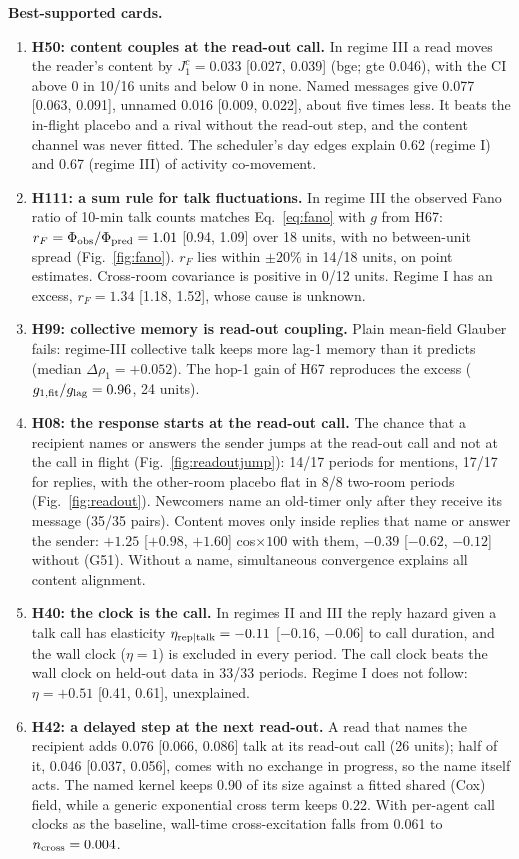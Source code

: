\textbf{Best-supported cards.}
\begin{enumerate}
\item \textbf{H50: content couples at the read-out call.} In regime III a read moves the reader's content by $J^c_1=0.033$ [0.027, 0.039] (bge; gte 0.046), with the CI above 0 in 10/16 units and below 0 in none. Named messages give 0.077 [0.063, 0.091], unnamed 0.016 [0.009, 0.022], about five times less. It beats the in-flight placebo and a rival without the read-out step, and the content channel was never fitted. The scheduler's day edges explain 0.62 (regime I) and 0.67 (regime III) of activity co-movement.
\item \textbf{H111: a sum rule for talk fluctuations.} In regime III the observed Fano ratio of 10-min talk counts matches Eq.~\eqref{eq:fano} with $g$ from H67: $r_F=\Phi_{\rm obs}/\Phi_{\rm pred}=1.01$ [0.94, 1.09] over 18 units, with no between-unit spread (Fig.~\ref{fig:fano}). $r_F$ lies within $\pm20\%$ in 14/18 units, on point estimates. Cross-room covariance is positive in 0/12 units. Regime I has an excess, $r_F=1.34$ [1.18, 1.52], whose cause is unknown.
\item \textbf{H99: collective memory is read-out coupling.} Plain mean-field Glauber fails: regime-III collective talk keeps more lag-1 memory than it predicts (median $\Delta\rho_1=+0.052$). The hop-1 gain of H67 reproduces the excess ($g_{1,\rm fit}/g_{\rm lag}=0.96$, 24 units).
\item \textbf{H08: the response starts at the read-out call.} The chance that a recipient names or answers the sender jumps at the read-out call and not at the call in flight (Fig.~\ref{fig:readoutjump}): 14/17 periods for mentions, 17/17 for replies, with the other-room placebo flat in 8/8 two-room periods (Fig.~\ref{fig:readout}). Newcomers name an old-timer only after they receive its message (35/35 pairs). Content moves only inside replies that name or answer the sender: $+1.25$ [$+0.98$, $+1.60$] cos$\times100$ with them, $-0.39$ [$-0.62$, $-0.12$] without (G51). Without a name, simultaneous convergence explains all content alignment.
\item \textbf{H40: the clock is the call.} In regimes II and III the reply hazard given a talk call has elasticity $\eta_{\rm rep|talk}=-0.11$ [$-0.16$, $-0.06$] to call duration, and the wall clock ($\eta=1$) is excluded in every period. The call clock beats the wall clock on held-out data in 33/33 periods. Regime I does not follow: $\eta=+0.51$ [0.41, 0.61], unexplained.
\item \textbf{H42: a delayed step at the next read-out.} A read that names the recipient adds 0.076 [0.066, 0.086] talk at its read-out call (26 units); half of it, 0.046 [0.037, 0.056], comes with no exchange in progress, so the name itself acts. The named kernel keeps 0.90 of its size against a fitted shared (Cox) field, while a generic exponential cross term keeps 0.22. With per-agent call clocks as the baseline, wall-time cross-excitation falls from 0.061 to $n_{\rm cross}=0.004$.
\end{enumerate}


